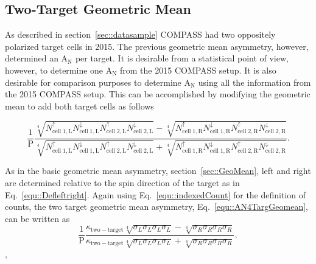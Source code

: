 \subsection{Two-Target Geometric Mean} \label{sec::TwoTargGeoMean}
As described in section~\ref{sec::datasample} COMPASS had two oppositely
polarized target cells in 2015.  The previous geometric mean asymmetry, however,
determined an A$_{\mathrm{N}}$ per target.  It is desirable from a statistical
point of view, however, to determine one A$_{\mathrm{N}}$ from the 2015 COMPASS
setup.  It is also desirable for comparison purposes to determine
A$_{\mathrm{N}}$ using all the information from the 2015 COMPASS setup.  This
can be accomplished by modifying the geometric mean to add both target cells as
follows

\begin{equation}
  \label{equ::AN4TargGeomean}
  \frac{1}{\mathrm{P}}
  \frac{
    \sqrt[4]{
      N_{\mathrm{cell\;1,L}}^{\uparrow}N_{\mathrm{cell\;1, L}}^{\downarrow}
      N_{\mathrm{cell\;2,L}}^{\uparrow}N_{\mathrm{cell\;2, L}}^{\downarrow}
    } -
    \sqrt[4]{
      N_{\mathrm{cell\;1,R}}^{\uparrow}N_{\mathrm{cell\;1, R}}^{\downarrow}
      N_{\mathrm{cell\;2,R}}^{\uparrow}N_{\mathrm{cell\;2, R}}^{\downarrow}
    }
  }{
    \sqrt[4]{
      N_{\mathrm{cell\;1,L}}^{\uparrow}N_{\mathrm{cell\;1, L}}^{\downarrow}
      N_{\mathrm{cell\;2,L}}^{\uparrow}N_{\mathrm{cell\;2, L}}^{\downarrow}
    } +
    \sqrt[4]{
      N_{\mathrm{cell\;1,R}}^{\uparrow}N_{\mathrm{cell\;1, R}}^{\downarrow}
      N_{\mathrm{cell\;2,R}}^{\uparrow}N_{\mathrm{cell\;2, R}}^{\downarrow}
    }
  }.
\end{equation}

As in the basic geometric mean asymmetry, section~\ref{sec::GeoMean}, left and
right are determined relative to the spin direction of the target as in
Eq.~\ref{equ::Defleftright}.  Again using Eq.~\ref{equ::indexedCount} for the
definition of counts, the two target geometric mean asymmetry,
Eq.~\ref{equ::AN4TargGeomean}, can be written as
\begin{equation}
  \frac{1}{\mathrm{P}}
  \frac{
    \kappa_{\mathrm{two-target}} \sqrt[4]{\sigma_{L}\sigma_{L}\sigma_{L}\sigma_{L}} -
    \sqrt[4]{\sigma_{R}\sigma_{R}\sigma_{R}\sigma_{R}}
  }{
    \kappa_{\mathrm{two-target}} \sqrt[4]{\sigma_{L}\sigma_{L}\sigma_{L}\sigma_{L}} +
    \sqrt[4]{\sigma_{R}\sigma_{R}\sigma_{R}\sigma_{R}}
  },
\end{equation},

